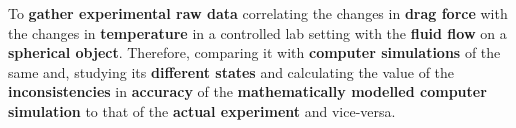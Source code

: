{To \textbf{gather experimental raw data} correlating the changes in \textbf{drag force} with the changes in \textbf{temperature} in a controlled lab setting with the \textbf{fluid flow} on a \textbf{spherical object}. Therefore, comparing it with \textbf{computer simulations} of the same and, studying its \textbf{different states} and calculating the value of the \textbf{inconsistencies} in \textbf{accuracy} of the \textbf{mathematically modelled computer simulation} to that of the \textbf{actual experiment} and vice-versa.}

